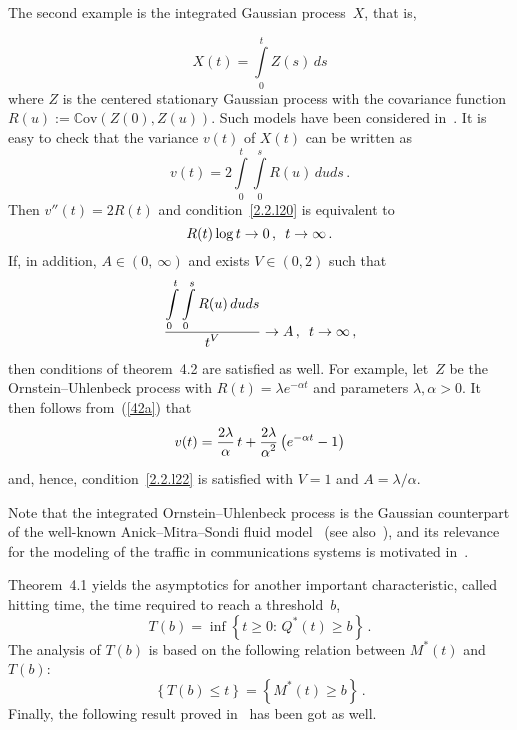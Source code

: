 \begin{multicols}{2}
The second example is the integrated Gaussian process~$X$, that is,

\noindent
\begin{equation*}
X(t)=\int\limits_0^t Z(s)\,ds
\end{equation*}
where $Z$ is the centered stationary Gaussian process with the
covariance function  $R(u):=\mathbb{C}\mathrm{ov}(Z(0),Z(u))$. Such models
 have been considered in~\cite{Kulkarni, Debicki1}. It is easy to
check that the variance $v(t)$ of  $X(t)$ can be written as
\begin{equation}
v(t)=2 \int\limits_0^t \int\limits_0^s R(u)\,duds\,.
\label{42a}
\end{equation}
Then $v''(t)=2 R(t)$ and condition~\eqref{2.2.l20} is equivalent to
\begin{equation*}
R(t)\log t \to 0\,,\enskip t \to \infty\,.
\end{equation*}
If, in addition, $A \in (0,\ \infty)$ and  exists $V \in (0,2)$
such that
\begin{equation}
\displaystyle\frac{\displaystyle \int\limits_0^t \int\limits_0^s R(u)\,duds\mathstrut}{\displaystyle t^V\mathstrut} \to A\,,\enskip
t \to \infty\,,
\label{2.2.l22}
\end{equation}
then conditions of  theorem~4.2 are
satisfied as well. For example, let~$Z$ be the Ornstein--Uhlenbeck
process with $R(t)=\lambda e^{-\alpha t}$ and parameters
$\lambda,\alpha>0$. It then follows from~(\ref{42a}) that
$$
v(t)=\displaystyle\frac{\displaystyle 2 \lambda\mathstrut}{\displaystyle \alpha\mathstrut}\,t+\displaystyle\frac{\displaystyle 2\lambda\mathstrut}{\displaystyle \alpha^2\mathstrut}\left(e^{-\alpha t}-1\right)
$$
and, hence, condition~\eqref{2.2.l22} is satisfied with  $V=1$ and
$A={\lambda}/{\alpha}$.

Note that the integrated Ornstein--Uhlenbeck process is the Gaussian
counterpart of the well-known Anick--Mitra--Sondi fluid model~\cite{Anick}
(see also~\cite{Addie}), and its relevance for the
modeling of the  traffic in communications systems is  motivated in~\cite{Kulkarni}.

Theorem~4.1 yields the asymptotics for another important
characteristic, called hitting time,  the time required to reach  a
threshold~$b$,
$$
T(b)=\inf\left\{t \geq 0:\,Q^*(t)\geq b\right\}\,.
$$
The analysis of $T(b)$ is based on the  following relation between
$M^*(t)$ and~$T(b)$:
\begin{equation*}
\left\{ T(b) \leq t\right\}=\left\{M^*(t) \geq b \right\}\,.
\end{equation*}
Finally, the following result proved in~\cite{Luk2} has been got as well.


\smallskip


\end{multicols}
